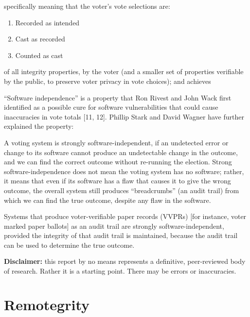 \renewcommand*\thedescriptcount{(\arabic{descriptcount})}
\begin{description}[%
  before={\setcounter{descriptcount}{0}},%
  font=\mdseries\stepcounter{descriptcount}\thedescriptcount\bfseries~]
  \item[End-To-End Integrity,] specifically meaning that the voter's vote selections are:
  \begin{enumerate}[label=\alph*.]
    \item Recorded as intended
    \item Cast as recorded
    \item Counted as cast
  \end{enumerate}

  \item[Verifiability] of all integrity properties, by the voter (and a smaller set of properties verifiable by the public, to preserve voter privacy in vote choices); and achieves

  \item[Software Independence] ``Software independence'' is a property that Ron Rivest and John Wack first identified as a possible cure for software vulnerabilities that could cause inaccuracies in vote totals [11, 12]. Phillip Stark and David Wagner have further explained the property:

A voting system is strongly software-independent, if an undetected error or change to its software cannot produce an undetectable change in the outcome, and we can find the correct outcome without re-running the election. Strong software-independence does not mean the voting system has no software; rather, it means that even if its software has a flaw that causes it to give the wrong outcome, the overall system still produces ``breadcrumbs'' (an audit trail) from which we can find the true outcome, despite any flaw in the software.

Systems that produce voter-verifiable paper records (VVPRs) [for instance, voter marked paper ballots] as an audit trail are strongly software-independent, provided the integrity of that audit trail is maintained, because the audit trail can be used to determine the true outcome.
\end{description}

\textbf{Disclaimer: }this report by no means represents a definitive, peer-reviewed body of research. Rather it is a starting point. There may be errors or inaccuracies.

\section{Remotegrity}

